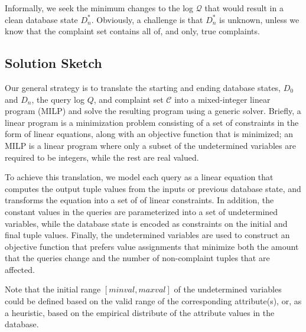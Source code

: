 Informally, we seek the minimum changes to the log $\mathcal{Q}$
that would result in a clean database state $D_n^*$. Obviously, a
challenge is that $D_n^*$ is unknown, unless we know that the
complaint set contains all of, and only, true complaints. 


\subsection{Solution Sketch}

Our general strategy is to translate the starting
and ending database states, $D_0$ and $D_n$, the query log $Q$, and
complaint set $\mathcal{C}$ into a mixed-integer linear program (MILP)
and solve the resulting program using a generic solver.  
Briefly, a linear program is a minimization problem consisting of
a set of constraints in the form of linear equations, along with
an objective function that is minimized; an MILP is a linear program
where only a subset of the undetermined variables are required to
be integers, while the rest are real valued.  

\iffalse
For example, in the following
example, $b$ and $z$ are undetermined integer and real valued variables, respectively,
whereas $x$ is determined to be $1$.  The objective function is $b+z$, 
resulting in the optimal solution $b = z = 1$.

\[
\begin{array}{l l l}
minimize      & b + z\\
\mbox{s.t.}   &x &= b * z \\
              &x &= 1\\
              &b &\in \{0, 1, 2, 3\}\\
              &z &\le 6\\
              &z &\ge 0\\
\end{array}
\]
\fi

To achieve this translation,
we model each query as a linear equation that computes the output
tuple values from the inputs or previous database state,
and transforms the equation into a
set of of linear constraints. In addition, the constant values in
the queries are parameterized into a set of undetermined variables,
while the database state is encoded as constraints on the initial
and final tuple values. Finally, the undetermined variables are
used to construct an objective function that prefers value assignments
that minimize both the amount that the queries change and the number
of non-complaint tuples that are affected.

Note that the initial range $[minval, maxval]$ of the 
undetermined variables could be defined based on
the valid range of the corresponding attribute(s), or, as a heuristic,
based on the empirical distribute of the attribute values in the database. 

